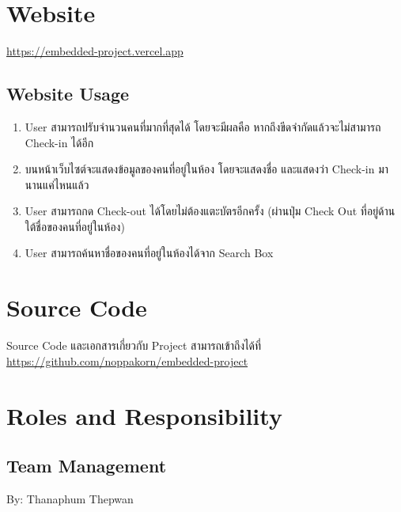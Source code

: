\documentclass[fontsize=14pt]{extarticle}
\begin{document}
\section{Website}
\url{https://embedded-project.vercel.app}
\subsection{Website Usage}
\begin{enumerate}
    \item User สามารถปรับจำนวนคนที่มากที่สุดได้ โดยจะมีผลคือ หากถึงขีดจำกัดแล้วจะไม่สามารถ Check-in ได้อีก
    \item บนหน้าเว็บไซต์จะแสดงข้อมูลของคนที่อยู่ในห้อง โดยจะแสดงชื่อ และแสดงว่า Check-in มานานแค่ไหนแล้ว
    \item User สามารถกด Check-out ได้โดยไม่ต้องแตะบัตรอีกครั้ง (ผ่านปุ่ม Check Out ที่อยู่ด้านใต้ชื่อของคนที่อยู่ในห้อง)
    \item User สามารถค้นหาชื่อของคนที่อยู่ในห้องได้จาก Search Box
\end{enumerate}
\section{Source Code}
Source Code และเอกสารเกี่ยวกับ Project สามารถเข้าถึงได้ที่ \url{https://github.com/noppakorn/embedded-project}
\pagebreak
\section{Roles and Responsibility}
\subsection{Team Management}
By: Thanaphum Thepwan\\
\end{document}

